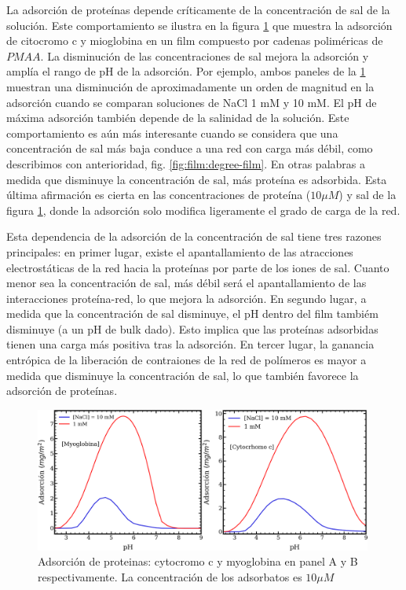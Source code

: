 La adsorci\'on de prote\'inas depende cr\'iticamente de la concentraci\'on de sal de la soluci\'on. Este comportamiento se ilustra en la figura \ref{fig:film:ad-pro} que muestra la adsorci\'on de citocromo c  y mioglobina en un film compuesto por cadenas polim\'ericas de $PMAA$. La disminuci\'on de las concentraciones de sal mejora la adsorci\'on y ampl\'ia el rango de pH de la adsorci\'on. 
Por ejemplo, ambos paneles de la \ref{fig:film:ad-pro} muestran una disminuci\'on de aproximadamente un orden de magnitud en la adsorci\'on cuando se comparan soluciones de NaCl 1 mM y 10 mM. 
El pH de m\'axima adsorci\'on tambi\'en depende de la salinidad de la soluci\'on. Este comportamiento es a\'un m\'as interesante cuando se considera que una concentraci\'on de sal m\'as baja conduce a una red con carga m\'as d\'ebil, como describimos con anterioridad, fig. \ref{fig:film:degree-film}. 
En otras palabras a medida que disminuye la concentraci\'on de sal, m\'as prote\'ina es adsorbida. Esta \'ultima afirmaci\'on es cierta en las concentraciones de prote\'ina ($10 \mu M$) y sal de la figura \ref{fig:film:ad-pro}, donde la adsorci\'on solo modifica ligeramente el grado de carga de la red.

Esta dependencia de la adsorci\'on de la concentraci\'on de sal tiene tres razones principales: en primer lugar, existe el apantallamiento  de las atracciones electrost\'aticas de la red hacia la prote\'inas por parte de los iones de sal. 
Cuanto menor sea la concentraci\'on de sal, m\'as débil ser\'a el apantallamiento de las interacciones prote\'ina-red, lo que mejora la adsorci\'on. 
En segundo lugar, a medida que la concentraci\'on de sal disminuye, el pH dentro del film tambi\'em disminuye (a un pH de bulk dado). 
Esto implica que las prote\'inas adsorbidas tienen una carga m\'as positiva tras la adsorci\'on. 
En tercer lugar, la ganancia entr\'opica de la liberaci\'on de contraiones de la red de pol\'imeros es mayor a medida que disminuye la concentraci\'on de sal, lo que tambi\'en favorece la adsorci\'on de prote\'inas.



\begin{figure}
    \centering
    \includegraphics[width=0.99\textwidth]{Figures/graph-film/ad-proteins.png}
    \caption{Adsorci\'on de proteinas: cytocromo c y myoglobina en panel A y B respectivamente. La concentraci\'on de los adsorbatos es $10 \mu M$}
    \label{fig:film:ad-pro}
\end{figure}
